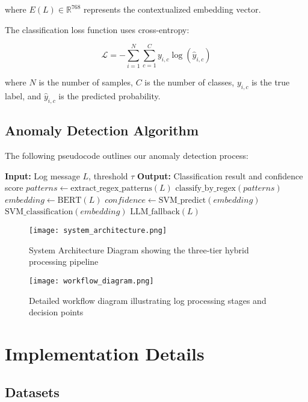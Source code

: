 \documentclass[conference]{IEEEtran}
\begin{document}
where $E(L) \in \mathbb{R}^{768}$ represents the contextualized embedding vector.

The classification loss function uses cross-entropy:

\begin{equation}
\mathcal{L} = -\sum_{i=1}^{N} \sum_{c=1}^{C} y_{i,c} \log(\hat{y}_{i,c})
\end{equation}

where $N$ is the number of samples, $C$ is the number of classes, $y_{i,c}$ is the true label, and $\hat{y}_{i,c}$ is the predicted probability.

\subsection{Anomaly Detection Algorithm}

The following pseudocode outlines our anomaly detection process:

\begin{algorithmic}
\STATE \textbf{Input:} Log message $L$, threshold $\tau$
\STATE \textbf{Output:} Classification result and confidence score
\STATE
\STATE $patterns \leftarrow \text{extract\_regex\_patterns}(L)$
    \RETURN $\text{classify\_by\_regex}(patterns)$
\ENDIF
\STATE
\STATE $embedding \leftarrow \text{BERT}(L)$
\STATE $confidence \leftarrow \text{SVM\_predict}(embedding)$
    \RETURN $\text{SVM\_classification}(embedding)$
\ELSE
    \RETURN $\text{LLM\_fallback}(L)$
\ENDIF
\end{algorithmic}

\begin{figure}[htbp]
\centerline{\texttt{[image: system\_architecture.png]}}
\caption{System Architecture Diagram showing the three-tier hybrid processing pipeline}
\label{fig:architecture}
\end{figure}

\begin{figure}[htbp]
\centerline{\texttt{[image: workflow\_diagram.png]}}
\caption{Detailed workflow diagram illustrating log processing stages and decision points}
\label{fig:workflow}
\end{figure}

\section{Implementation Details}

\subsection{Datasets}
\end{document}
